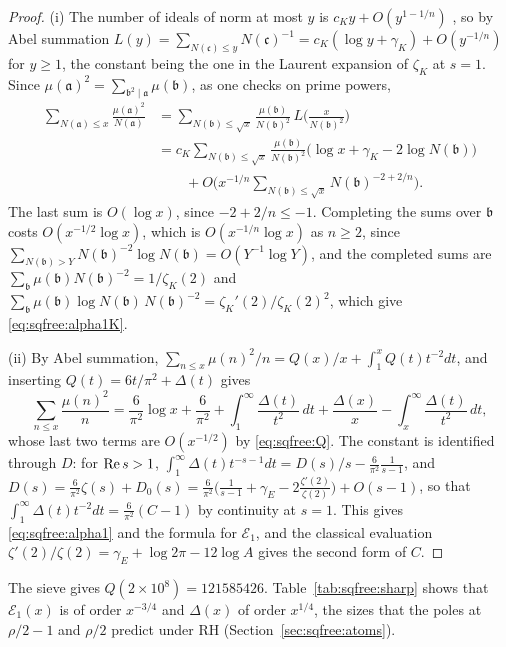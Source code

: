 \begin{proof}
(i) The number of ideals of norm at most $y$ is $c_Ky+O(y^{1-1/n})$ \cite[Chapter~VI]{Lang94}, so by Abel summation $L(y)=\sum_{N(\mathfrak c)\le y}N(\mathfrak c)^{-1}=c_K(\log y+\gamma_K)+O(y^{-1/n})$ for $y\ge1$, the constant being the one in the Laurent expansion of $\zeta_K$ at $s=1$. Since $\mu(\mathfrak a)^2=\sum_{\mathfrak b^2\mid\mathfrak a}\mu(\mathfrak b)$, as one checks on prime powers,
\begin{align*}
\sum_{N(\mathfrak a)\le x}\frac{\mu(\mathfrak a)^2}{N(\mathfrak a)}&=\sum_{N(\mathfrak b)\le\sqrt x}\frac{\mu(\mathfrak b)}{N(\mathfrak b)^2}\,L\Big(\frac x{N(\mathfrak b)^2}\Big)\\
&=c_K\sum_{N(\mathfrak b)\le\sqrt x}\frac{\mu(\mathfrak b)}{N(\mathfrak b)^2}\big(\log x+\gamma_K-2\log N(\mathfrak b)\big)\\
&\qquad+O\Big(x^{-1/n}\sum_{N(\mathfrak b)\le\sqrt x}N(\mathfrak b)^{-2+2/n}\Big).
\end{align*}
The last sum is $O(\log x)$, since $-2+2/n\le-1$. Completing the sums over $\mathfrak b$ costs $O(x^{-1/2}\log x)$, which is $O(x^{-1/n}\log x)$ as $n\ge2$, since $\sum_{N(\mathfrak b)>Y}N(\mathfrak b)^{-2}\log N(\mathfrak b)=O(Y^{-1}\log Y)$, and the completed sums are $\sum_{\mathfrak b}\mu(\mathfrak b)N(\mathfrak b)^{-2}=1/\zeta_K(2)$ and $\sum_{\mathfrak b}\mu(\mathfrak b)\log N(\mathfrak b)\,N(\mathfrak b)^{-2}=\zeta_K'(2)/\zeta_K(2)^2$, which give \eqref{eq:sqfree:alpha1K}.

(ii) By Abel summation, $\sum_{n\le x}\mu(n)^2/n=Q(x)/x+\int_1^xQ(t)t^{-2}dt$, and inserting $Q(t)=6t/\pi^2+\Delta(t)$ gives
\[
\sum_{n\le x}\frac{\mu(n)^2}n=\frac6{\pi^2}\log x+\frac6{\pi^2}+\int_1^\infty\frac{\Delta(t)}{t^2}\,dt+\frac{\Delta(x)}x-\int_x^\infty\frac{\Delta(t)}{t^2}\,dt,
\]
whose last two terms are $O(x^{-1/2})$ by \eqref{eq:sqfree:Q}. The constant is identified through $D$: for $\operatorname{Re} s>1$, $\int_1^\infty\Delta(t)t^{-s-1}dt=D(s)/s-\frac6{\pi^2}\frac1{s-1}$, and $D(s)=\frac6{\pi^2}\zeta(s)+D_0(s)=\frac6{\pi^2}\big(\frac1{s-1}+\gamma_E-2\frac{\zeta'(2)}{\zeta(2)}\big)+O(s-1)$, so that $\int_1^\infty\Delta(t)t^{-2}dt=\frac6{\pi^2}(C-1)$ by continuity at $s=1$. This gives \eqref{eq:sqfree:alpha1} and the formula for $\mathcal E_1$, and the classical evaluation $\zeta'(2)/\zeta(2)=\gamma_E+\log2\pi-12\log A$ gives the second form of $C$.
\end{proof}

The sieve gives $Q(2\times10^8)=121585426$. Table~\ref{tab:sqfree:sharp} shows that $\mathcal E_1(x)$ is of order $x^{-3/4}$ and $\Delta(x)$ of order $x^{1/4}$, the sizes that the poles at $\rho/2-1$ and $\rho/2$ predict under RH (Section~\ref{sec:sqfree:atoms}).

